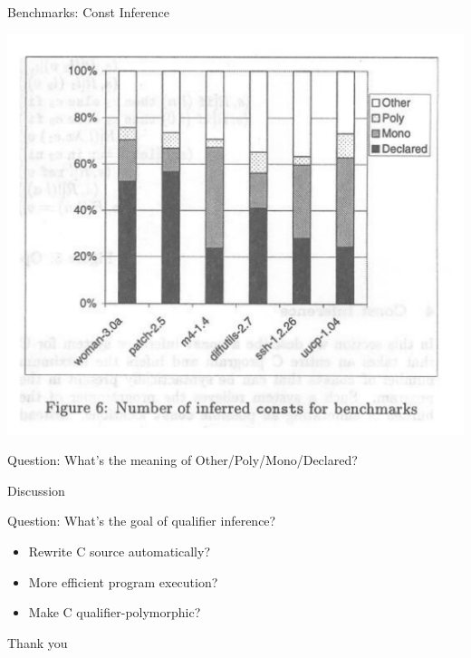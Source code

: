 \documentclass{beamer}
\begin{document}
\begin{frame}{Benchmarks: Const Inference}

\begin{center}
\includegraphics[scale=0.5]{paper_figure_6.png}
\end{center}

Question: What's the meaning of Other/Poly/Mono/Declared?


\end{frame}

\begin{frame}{Discussion}

Question: What's the goal of qualifier inference?\pause
\begin{itemize}
\item Rewrite C source automatically?
\item More efficient program execution?
\item Make C qualifier-polymorphic?
\end{itemize}

\end{frame}

\begin{frame}
\begin{Huge}
\begin{center}
Thank you \smiley
\end{center}
\end{Huge}
\end{frame}
\end{document}
